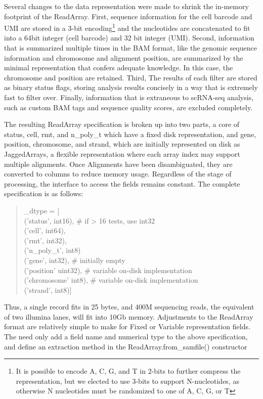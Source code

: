 Several changes to the data representation were made to shrink the in-memory footprint of the ReadArray. 
First, sequence information for the cell barcode and UMI are stored in a 3-bit encoding\footnote{It is possible to encode A, C, G, and T in 2-bits to further compress the representation, but we elected to use 3-bits to support N-nucleotides, as otherwise N nucleotides must be randomized to one of A, C, G, or T} and the nucleotides are concatenated to fit into a 64bit integer (cell barcode) and 32 bit integer (UMI).
Second, information that is summarized multiple times in the BAM format, like the genomic sequence information and chromosome and alignment position, are summarized by the minimal representation that confers adequate knowledge. 
In this case, the chromosome and position are retained.
Third, The results of each filter are stored as binary status flags, storing analysis results concisely in a way that is extremely fast to filter over.
Finally, information that is extraneous to scRNA-seq analysis, such as custom BAM tags and sequence quality scores, are excluded completely. 

The resulting ReadArray specification is broken up into two parts, a core of status, {\mono cell, rmt,} and {\mono n\_poly\_t} which have a fixed disk representation, and {\mono gene, position, chromosome,} and {\mono strand}, which are initially represented on disk as JaggedArrays, a flexible representation where each array index may support multiple alignments. Once Alignments have been disambiguated, they are converted to columns to reduce memory usage. 
Regardless of the stage of processing, the interface to access the fields remains constant.
The complete specification is as follows: 
\begin{quote}
\onehalfspacing
{\mono
\_dtype = [ \\
\quad('status', int16),   \# if > 16 tests, use int32\\
\quad('cell', int64),\\
\quad('rmt', int32),\\
\quad('n\_poly\_t', int8)\\
\quad('gene', int32),     \# initially empty\\
\quad('position' uint32), \# variable on-disk implementation\\
\quad('chromosome' int8), \# variable on-disk implementation\\
\quad('strand', int8)]\\
}
\end{quote}
Thus, a single record fits in 25 bytes, and 400M sequencing reads, the equivalent of two illumina lanes, will fit into 10Gb memory.
Adjustments to the ReadArray format are relatively simple to make for Fixed or Variable representation fields. 
The need only add a field name and numerical type to the above specification, and define an extraction method in the {\mono ReadArray.from\_samfile()} constructor

